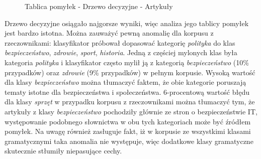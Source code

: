 \begin{figure}[ht!]
	\centering
    \qquad
	\caption{Tablica pomyłek - Drzewo decyzyjne - Artykuły}
    \label{fig:c-matrix-dt-articles}
\end{figure}
Drzewo decyzyjne osiągało najgorsze wyniki, więc analiza jego tablicy pomyłek jest bardzo istotna. Można zauważyć pewną anomalię dla korpusu z rzeczownikami: klasyfikator próbował dopasować kategorię \textit{polityka} do klas \textit{bezpieczeństwo}, \textit{zdrowie}, \textit{sport}, \textit{historia}. 
Jedną z częściej mylonych klas była kategoria \textit{polityka} i klasyfikator często  mylił ją z kategorią \textit{bezpieczeństwo} (10\% przypadków) oraz \textit{zdrowie} (9\% przypadków) w pełnym korpusie. Wysoką wartość dla klasy \textit{bezpieczeństwo} można tłumaczyć faktem, że obie kategorie poruszają tematy istotne dla bezpieczeństwa i społeczeństwa. 6-procentową wartość błędu dla klasy \textit{sprzęt} w przypadku korpusu z rzeczownikami można tłumaczyć tym, że artykuły z klasy \textit{bezpieczeństwo} pochodziły głównie ze stron o bezpieczeństwie IT, występowanie podobnego słownictwa w obu tych kategoriach może być źródłem pomyłek. Na uwagę również zasługuje fakt, iż w korpusie ze wszystkimi klasami gramatycznymi taka anomalia nie występuje, więc dodatkowe klasy gramatyczne skutecznie stłumiły niepasujące cechy.
